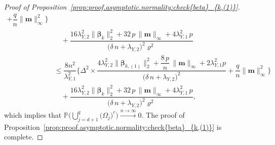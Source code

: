 \documentclass[
  12pt]{article}
\def\M{\mathbf{m}}
\begin{document}
\begin{proof}[Proof of Proposition~\ref{prop:proof.asymptotic.normality:check{beta}_{k,(1)}}]
\begin{align*}
		+  \dfrac{q}{n}      \big\| \M   \big\|_{\infty}^{2}    \Bigg\} 
		\\
		& \quad  +
		\dfrac{  16  \lambda_{Y,2}^{2}   \big\| \bm{\beta}_{k}   \big\|_{2}^{2}+ 32\, p \,  \big\| \M \big\|_{\infty}   +  4 \lambda_{Y,1}^{2} \,  p   
		}{ \big(  \delta \, n   +   \lambda_{Y,2}  \big)^{2}  \varrho^{2} } 
		\\
	& \leq   \dfrac{8 n^{2}}{\lambda_{Y,1}^{2}}\Bigg \{   \Delta^{2}  \times   \dfrac{ 4  \lambda_{Y,2}^{2}   \big\| \bm{\beta}_{k,(1)}   \big\|_{2}^{2}  +    \dfrac{8 \, p}{n}  \,    \big\| \M \big\|_{\infty} 
			+  2 \lambda_{Y,1}^{2} p  
		}{ \big(  \delta \, n   +   \lambda_{Y,2}  \big)^{2} }   
		+  \dfrac{q}{n}    \big\| \M   \big\|_{\infty}^{2}    \Bigg\} 
		\\
		& \quad  +
		\dfrac{  16  \lambda_{Y,2}^{2}   \big\| \bm{\beta}_{k}   \big\|_{2}^{2}+ 32 \, p \,  \big\| \M \big\|_{\infty}   +  4 \lambda_{Y,1}^{2} \,  p   
		}{ \big(  \delta \, n   +   \lambda_{Y,2}  \big)^{2}  \varrho^{2} },
	\end{align*}
	which implies that $\mathbb{P} \Bigg(  \bigcup_{j = d+1}^{q} 
	\big( \Omega_{j} \big)^{c} \Bigg)    \overset{ n \rightarrow \infty }{ \longrightarrow } 0 $.
	The proof of Proposition~\ref{prop:proof.asymptotic.normality:check{beta}_{k,(1)}} is complete. 
\end{proof}
\end{document}
